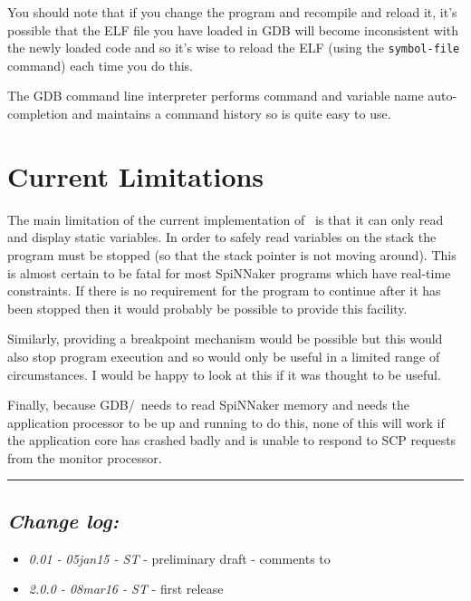 You should note that if you change the program and recompile and
reload it, it's possible that the ELF file you have loaded in GDB will
become inconsistent with the newly loaded code and so it's wise to
reload the ELF (using the \texttt{symbol-file} command) each time you
do this.

The GDB command line interpreter performs command and variable name
auto-completion and maintains a command history so is quite easy to
use.

\section{Current Limitations}

The main limitation of the current implementation of \gdbspin\ is
that it can only read and display static variables. In order to safely
read variables on the stack the program must be stopped (so that the
stack pointer is not moving around). This is almost certain to be
fatal for most SpiNNaker programs which have real-time constraints.
If there is no requirement for the program to continue after it
has been stopped then it would probably be possible to provide this
facility.

Similarly, providing a breakpoint mechanism would be possible but this
would also stop program execution and so would only be useful in a
limited range of circumstances. I would be happy to look at this if it
was thought to be useful.

Finally, because GDB/\gdbspin\ needs to read SpiNNaker memory and
needs the application processor to be up and running to do this, none
of this will work if the application core has crashed badly and is
unable to respond to SCP requests from the monitor processor.

\rule{\linewidth}{1pt}

\subsection{\itshape Change log:}

\begin{itemize}
\item {\itshape 0.01 - 05jan15 - ST} - preliminary draft - comments to
  {\itshape \Email}
\item {\itshape 2.0.0 - 08mar16 - ST} - first release
\end{itemize}


